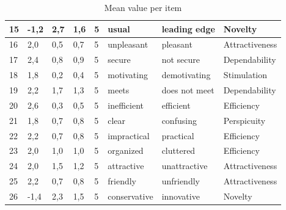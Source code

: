 \documentclass[conference,onecolumn]{IEEEtran}
\begin{document}
\begin{table}[H]
\begin{center}
\begin{tabular}[H]{ |m{1cm}|m{1cm}|m{1.2cm}|m{1.2cm}|m{1cm}|m{2cm}|m{3cm}|m{2cm}|}
                15	&-1,2	&2,7	&1,6	&5	&usual	                &leading edge	            &Novelty        \\ \hline
                16	&2,0	&0,5	&0,7	&5	&unpleasant	            &pleasant	                &Attractiveness     \\ \hline
                17	&2,4	&0,8	&0,9	&5	&secure	                &not secure	                &Dependability      \\ \hline
                18	&1,8	&0,2	&0,4	&5	&motivating	            &demotivating	            &Stimulation        \\ \hline
                19	&2,2	&1,7	&1,3	&5	&meets			        &does not meet				&Dependability      \\ \hline
                20	&2,6	&0,3	&0,5	&5	&inefficient	        &efficient	                &Efficiency     \\ \hline
                21	&1,8	&0,7	&0,8	&5	&clear	                &confusing	                &Perspicuity        \\ \hline
                22	&2,2	&0,7	&0,8	&5	&impractical	        &practical	                &Efficiency     \\ \hline
                23	&2,0	&1,0	&1,0	&5	&organized	            &cluttered	                &Efficiency     \\ \hline
                24	&2,0	&1,5	&1,2	&5	&attractive	            &unattractive	            &Attractiveness     \\ \hline
                25	&2,2	&0,7	&0,8	&5	&friendly	            &unfriendly	                &Attractiveness     \\ \hline
                26	&-1,4	&2,3	&1,5	&5	&conservative	        &innovative	                &Novelty        \\ 
                \hline
            \end{tabular}
        \end{center}
        \caption{Mean value per item}
        \label{table:Mean value per item}
    \end{table}
\end{document}
